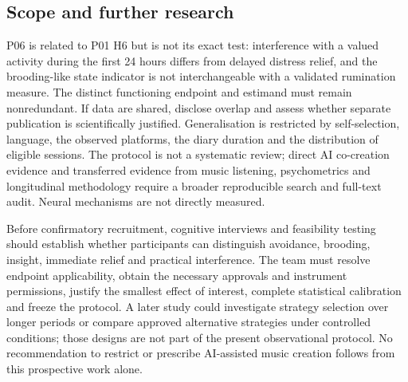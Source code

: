 \documentclass[11pt]{article}
\begin{document}
\subsection{Scope and further research}
P06 is related to P01 H6 but is not its exact test: interference with a valued activity during the first 24 hours differs from delayed distress relief, and the brooding-like state indicator is not interchangeable with a validated rumination measure. The distinct functioning endpoint and estimand must remain nonredundant. If data are shared, disclose overlap and assess whether separate publication is scientifically justified. Generalisation is restricted by self-selection, language, the observed platforms, the diary duration and the distribution of eligible sessions. The protocol is not a systematic review; direct AI co-creation evidence and transferred evidence from music listening, psychometrics and longitudinal methodology require a broader reproducible search and full-text audit. Neural mechanisms are not directly measured.

Before confirmatory recruitment, cognitive interviews and feasibility testing should establish whether participants can distinguish avoidance, brooding, insight, immediate relief and practical interference. The team must resolve endpoint applicability, obtain the necessary approvals and instrument permissions, justify the smallest effect of interest, complete statistical calibration and freeze the protocol. A later study could investigate strategy selection over longer periods or compare approved alternative strategies under controlled conditions; those designs are not part of the present observational protocol. No recommendation to restrict or prescribe AI-assisted music creation follows from this prospective work alone.

\printbibliography
\end{document}
